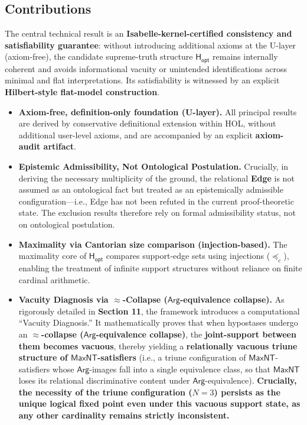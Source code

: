 \documentclass[a4paper, 11pt]{article}
\theoremstyle{plain}
\theoremstyle{definition}
\newcommand{\Arg}{\mathsf{Arg}}           %
\newcommand{\Hopt}{\mathsf{H_{opt}}}       %
\begin{document}
\subsection*{Contributions}
\label{subsec:contributions}

\noindent
The central technical result is an \textbf{Isabelle-kernel-certified consistency and satisfiability guarantee}:
without introducing additional axioms at the U-layer (axiom-free), the candidate supreme-truth structure
$\Hopt$ remains internally coherent and avoids informational vacuity or unintended identifications across minimal and flat interpretations.
Its satisfiability is witnessed by an explicit \textbf{Hilbert-style flat-model construction}.

\begin{itemize}

  \item \textbf{Axiom-free, definition-only foundation (U-layer).}
  All principal results are derived by conservative definitional extension within HOL, without additional user-level axioms, and are accompanied by an explicit \textbf{axiom-audit artifact}.

  \item \textbf{Epistemic Admissibility, Not Ontological Postulation.}
  Crucially, in deriving the necessary multiplicity of the ground, the relational \textbf{Edge}
  is not assumed as an ontological fact but treated as an epistemically admissible configuration---i.e.,
  Edge has not been refuted in the current proof-theoretic state. The exclusion results therefore rely on formal admissibility status, not on ontological postulation.

  \item \textbf{Maximality via Cantorian size comparison (injection-based).}
  The maximality core of $\Hopt$ compares support-edge sets using injections ($\preceq_c$), enabling the treatment of infinite support structures without reliance on finite cardinal arithmetic.

  \item \textbf{Vacuity Diagnosis via $\approx$-Collapse ($\Arg$-equivalence collapse).}
  As rigorously detailed in \textbf{Section 11}, the framework introduces a computational ``Vacuity Diagnosis.'' It mathematically proves that when hypostases undergo an \textbf{$\approx$-collapse ($\Arg$-equivalence collapse)}, the \textbf{joint-support between them becomes vacuous}, thereby yielding a \textbf{relationally vacuous triune structure of $\mathsf{MaxNT}$-satisfiers} (i.e., a triune configuration of $\mathsf{MaxNT}$-satisfiers whose $\Arg$-images fall into a single equivalence class, so that $\mathsf{MaxNT}$ loses its relational discriminative content under $\Arg$-equivalence). \textbf{Crucially, the necessity of the triune configuration ($N=3$) persists as the unique logical fixed point even under this vacuous support state, as any other cardinality remains strictly inconsistent.}


\end{itemize}
\end{document}
